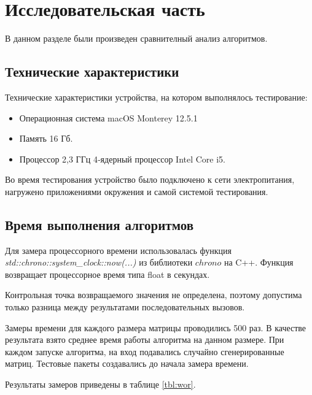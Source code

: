 \chapter{Исследовательская часть}

В данном разделе были произведен сравнителный анализ алгоритмов.

\section{Технические характеристики}

Технические характеристики устройства, на котором выполнялось тестирование:

\begin{itemize}
	\item Операционная система macOS Monterey 12.5.1 
	\item Память 16 Гб.
	\item Процессор 2,3 ГГц 4‑ядерный процессор Intel Core i5.
\end{itemize}

Во время тестирования устройство было подключено к сети электропитания, нагружено приложениями окружения и самой  системой тестирования.

\section{Время выполнения алгоритмов}

Для \hfill замера \hfill процессорного \hfill времени \hfill использовалась \hfill функция 
\\ \textit{std::chrono::system\_clock::now(...)} из библиотеки $chrono$ \cite{cpp-lang-chrono} на C++. Функция возвращает процессорное время типа float в секундах.

Контрольная точка возвращаемого значения не определена, поэтому допустима только разница между результатами последовательных вызовов.

Замеры времени для каждого размера матрицы проводились 500 раз. В качестве результата взято среднее время работы алгоритма на данном размере. При каждом запуске алгоритма, на вход подавались случайно сгенерированные матриц. Тестовые пакеты создавались до начала замера времени.

Результаты замеров приведены в таблице \ref{tbl:wor}.

